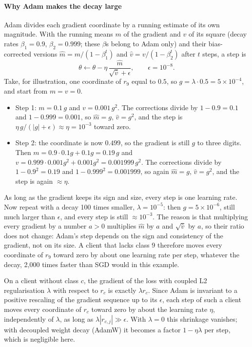 \paragraph{Why Adam makes the decay large} Adam divides each gradient coordinate by a running estimate of its own
magnitude. With the running means $m$ of the gradient and $v$ of its square (decay rates $\beta_1=0.9$,
$\beta_2=0.999$; these $\beta$s belong to Adam only) and their bias-corrected versions $\hat m=m/(1-\beta_1^t)$ and
$\hat v=v/(1-\beta_2^t)$ after $t$ steps, a step is
\[
\theta\leftarrow\theta-\eta\,\frac{\hat m}{\sqrt{\hat v}+\epsilon},\qquad\epsilon=10^{-8}.
\]
Take, for illustration, one coordinate of $r_9$ equal to $0.5$, so $g=\lambda\cdot0.5=5\times10^{-4}$, and start from
$m=v=0$.
\begin{itemize}
\item Step 1: $m=0.1\,g$ and $v=0.001\,g^2$. The corrections divide by $1-0.9=0.1$ and $1-0.999=0.001$, so $\hat m=g$,
$\hat v=g^2$, and the step is $\eta\,g/(|g|+\epsilon)\approx\eta=10^{-3}$ toward zero.
\item Step 2: the coordinate is now $0.499$, so the gradient is still $g$ to three digits. Then
$m=0.9\cdot0.1g+0.1g=0.19\,g$ and $v=0.999\cdot0.001g^2+0.001g^2=0.001999\,g^2$. The corrections divide by
$1-0.9^2=0.19$ and $1-0.999^2=0.001999$, so again $\hat m=g$, $\hat v=g^2$, and the step is again $\approx\eta$.
\end{itemize}
As long as the gradient keeps its sign and size, every step is one learning rate. Now repeat with a decay 100 times
smaller, $\lambda=10^{-5}$: then $g=5\times10^{-6}$, still much larger than $\epsilon$, and every step is still
$\approx10^{-3}$. The reason is that multiplying every gradient by a number $a>0$ multiplies $\hat m$ by $a$ and
$\sqrt{\hat v}$ by $a$, so their ratio does not change: Adam's step depends on the sign and consistency of the
gradient, not on its size. A client that lacks class 9 therefore moves every coordinate of $r_9$ toward zero by about
one learning rate per step, whatever the decay, 2,000 times faster than SGD would in this example.

\begin{lemma*}
On a client without class $c$, the gradient of the loss with coupled L2 regularisation $\lambda$ with respect to $r_c$
is exactly $\lambda r_c$. Since Adam is invariant to a positive rescaling of the gradient sequence up to its $\epsilon$,
each step of such a client moves every coordinate of $r_c$ toward zero by about the learning rate $\eta$, independently
of $\lambda$, as long as $\lambda|r_{c,j}|\gg\epsilon$. With $\lambda=0$ this shrinkage vanishes; with decoupled weight
decay (AdamW) it becomes a factor $1-\eta\lambda$ per step, which is negligible here.
\end{lemma*}

